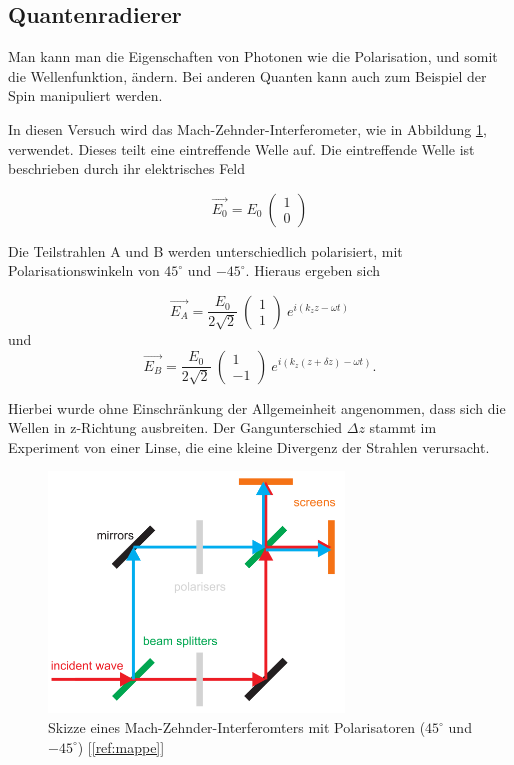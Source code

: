 \documentclass[a4paper,ngerman]{scrartcl}
\begin{document}
\subsection{Quantenradierer}
\label{ssec:quantenradierer}

Man kann man die Eigenschaften von Photonen wie die Polarisation, und somit die Wellenfunktion, ändern. 
Bei anderen Quanten kann auch zum Beispiel der Spin manipuliert werden.

In diesen Versuch wird das Mach-Zehnder-Interferometer, wie in Abbildung \ref{fig:mach-zehnder}, verwendet. Dieses teilt eine eintreffende Welle auf. Die eintreffende Welle ist beschrieben durch ihr elektrisches Feld
 
\begin{equation}
\vec{E_0} = E_0 \ \begin{pmatrix} 1\\ 0 \end{pmatrix}
\end{equation}

Die Teilstrahlen A 	und B werden unterschiedlich polarisiert, mit Polarisationswinkeln von $45^{\circ}$ und $-45^{\circ}$. 
Hieraus ergeben sich

\begin{equation}
\vec{E_A} = \frac{E_0}{2 \sqrt{2}} \ \begin{pmatrix} 1\\ 1 \end{pmatrix} \ e^{i (k_z z -\omega t)}
\end{equation}
und
\begin{equation}
\vec{E_B} = \frac{E_0}{2 \sqrt{2}} \ \begin{pmatrix} 1\\ -1 \end{pmatrix} \ e^{i (k_z (z + \delta z) -\omega t)} .
\end{equation}

Hierbei wurde ohne Einschränkung der Allgemeinheit angenommen, dass sich die Wellen in z-Richtung ausbreiten. 
Der Gangunterschied $\Delta z$ stammt im Experiment von einer Linse, die eine kleine Divergenz der Strahlen verursacht.

\begin{figure}
\includegraphics[width=0.7\textwidth]{mach-zehnder.png}
\caption{Skizze eines Mach-Zehnder-Interferomters mit Polarisatoren ($45^{\circ}$ und $-45^{\circ}$) [\ref{ref:mappe}]}
\label{fig:mach-zehnder}
\end{figure}
\end{document}
